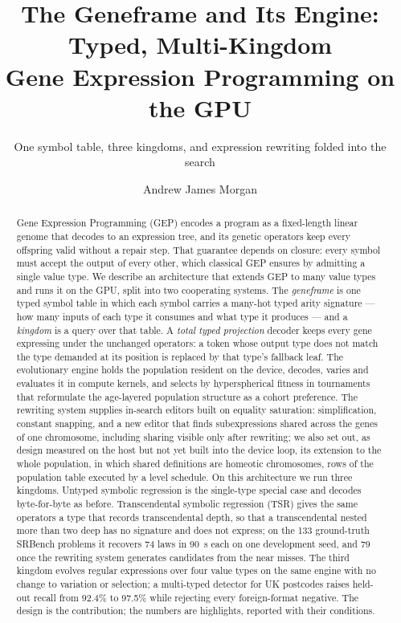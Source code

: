 \documentclass[sigconf,nonacm]{acmart}
\begin{document}
\title{The Geneframe and Its Engine: Typed, Multi-Kingdom\\
Gene Expression Programming on the GPU}
\subtitle{One symbol table, three kingdoms, and expression rewriting folded into
the search}

\author{Andrew James Morgan}
\renewcommand{\shortauthors}{Morgan}

\begin{abstract}
Gene Expression Programming (GEP) encodes a program as a fixed-length linear
genome that decodes to an expression tree, and its genetic operators keep every
offspring valid without a repair step. That guarantee depends on closure: every
symbol must accept the output of every other, which classical GEP ensures by
admitting a single value type. We describe an architecture that extends GEP to
many value types and runs it on the GPU, split into two cooperating systems. The
\emph{geneframe} is one typed symbol table in which each symbol carries a
many-hot typed arity signature --- how many inputs of each type it consumes and
what type it produces --- and a \emph{kingdom} is a query over that table. A
\emph{total typed projection} decoder keeps every gene expressing under the
unchanged operators: a token whose output type does not match the type demanded
at its position is replaced by that type's fallback leaf. The evolutionary engine
holds the population resident on the device, decodes, varies and evaluates it in
compute kernels, and selects by hyperspherical fitness in tournaments that
reformulate the age-layered population structure as a cohort preference. The
rewriting system supplies in-search editors built on equality saturation:
simplification, constant snapping, and a new editor that finds subexpressions
shared across the genes of one chromosome, including sharing visible only after
rewriting; we also set out, as design measured on the host but not yet built into
the device loop, its extension to the whole population, in which shared
definitions are homeotic chromosomes, rows of the population table executed by a
level schedule. On this architecture we run three kingdoms. Untyped symbolic
regression is the single-type special case and decodes byte-for-byte as before.
Transcendental symbolic regression (TSR) gives the same operators a type that
records transcendental depth, so that a transcendental nested more than two deep
has no signature and does not express; on the 133 ground-truth SRBench problems
it recovers 74 laws in 90~s each on one development seed, and 79 once the
rewriting system generates candidates from the near misses. The third kingdom
evolves regular expressions over four value types on the same engine with no
change to variation or selection; a multi-typed detector for UK postcodes raises
held-out recall from 92.4\% to 97.5\% while rejecting every foreign-format
negative. The design is the contribution; the numbers are highlights, reported
with their conditions.
\end{abstract}
\end{document}
